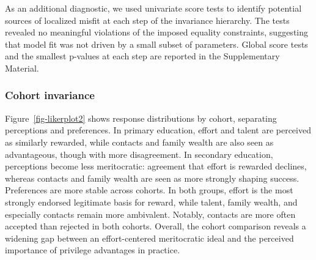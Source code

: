 \documentclass[
  13pt,
]{article}
\begin{document}
\begin{table}[H]

\caption{\label{tbl-longinv}Longitudinal invariance results}


\end{table}%

As an additional diagnostic, we used univariate score tests to identify
potential sources of localized misfit at each step of the invariance
hierarchy. The tests revealed no meaningful violations of the imposed
equality constraints, suggesting that model fit was not driven by a
small subset of parameters. Global score tests and the smallest p-values
at each step are reported in the Supplementary Material.

\subsubsection{Cohort invariance}\label{cohort-invariance}

Figure~\ref{fig-likerplot2} shows response distributions by cohort,
separating perceptions and preferences. In primary education, effort and
talent are perceived as similarly rewarded, while contacts and family
wealth are also seen as advantageous, though with more disagreement. In
secondary education, perceptions become less meritocratic: agreement
that effort is rewarded declines, whereas contacts and family wealth are
seen as more strongly shaping success. Preferences are more stable
across cohorts. In both groups, effort is the most strongly endorsed
legitimate basis for reward, while talent, family wealth, and especially
contacts remain more ambivalent. Notably, contacts are more often
accepted than rejected in both cohorts. Overall, the cohort comparison
reveals a widening gap between an effort-centered meritocratic ideal and
the perceived importance of privilege advantages in practice.
\end{document}
